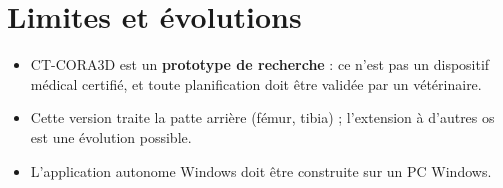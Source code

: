 \documentclass[11pt,a4paper]{article}
\begin{document}
\section{Limites et évolutions}

\begin{itemize}
  \item CT-CORA3D est un \textbf{prototype de recherche} : ce n'est pas un dispositif médical certifié, et toute
        planification doit être validée par un vétérinaire.
  \item Cette version traite la patte arrière (fémur, tibia) ; l'extension à d'autres os est une évolution possible.
  \item L'application autonome Windows doit être construite sur un PC Windows.
\end{itemize}
\end{document}
